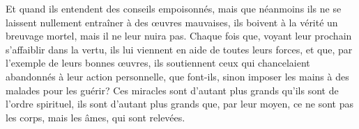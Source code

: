 Et quand ils entendent des conseils empoisonnés,
	mais que néanmoins
		ils ne se laissent nullement entraîner à des œuvres mauvaises,
	ils boivent à la vérité un breuvage mortel,
	mais il ne leur nuira pas.
Chaque fois que, voyant leur prochain s’affaiblir dans la vertu,
	ils lui viennent en aide de toutes leurs forces,
	et que, par l’exemple de leurs bonnes œuvres,
	ils soutiennent ceux qui chancelaient abandonnés à leur action personnelle,
	que font-ils, sinon imposer les mains à des malades pour les guérir?
Ces miracles sont d’autant plus grands qu’ils sont de l’ordre spirituel,
	ils sont d’autant plus grands que, par leur moyen,
	ce ne sont pas les corps, mais les âmes, qui sont relevées.
